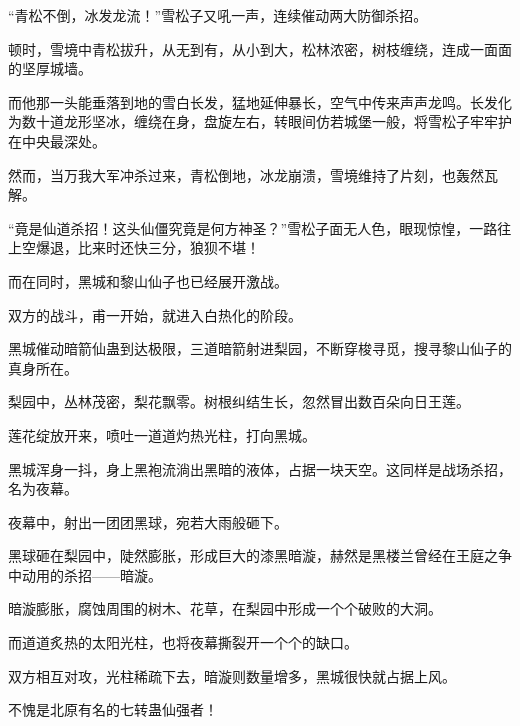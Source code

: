 \begin{this_body}
“青松不倒，冰发龙流！”雪松子又吼一声，连续催动两大防御杀招。

顿时，雪境中青松拔升，从无到有，从小到大，松林浓密，树枝缠绕，连成一面面的坚厚城墙。

而他那一头能垂落到地的雪白长发，猛地延伸暴长，空气中传来声声龙鸣。长发化为数十道龙形坚冰，缠绕在身，盘旋左右，转眼间仿若城堡一般，将雪松子牢牢护在中央最深处。

然而，当万我大军冲杀过来，青松倒地，冰龙崩溃，雪境维持了片刻，也轰然瓦解。

“竟是仙道杀招！这头仙僵究竟是何方神圣？”雪松子面无人色，眼现惊惶，一路往上空爆退，比来时还快三分，狼狈不堪！

而在同时，黑城和黎山仙子也已经展开激战。

双方的战斗，甫一开始，就进入白热化的阶段。

黑城催动暗箭仙蛊到达极限，三道暗箭射进梨园，不断穿梭寻觅，搜寻黎山仙子的真身所在。

梨园中，丛林茂密，梨花飘零。树根纠结生长，忽然冒出数百朵向日王莲。

莲花绽放开来，喷吐一道道灼热光柱，打向黑城。

黑城浑身一抖，身上黑袍流淌出黑暗的液体，占据一块天空。这同样是战场杀招，名为夜幕。

夜幕中，射出一团团黑球，宛若大雨般砸下。

黑球砸在梨园中，陡然膨胀，形成巨大的漆黑暗漩，赫然是黑楼兰曾经在王庭之争中动用的杀招——暗漩。

暗漩膨胀，腐蚀周围的树木、花草，在梨园中形成一个个破败的大洞。

而道道炙热的太阳光柱，也将夜幕撕裂开一个个的缺口。

双方相互对攻，光柱稀疏下去，暗漩则数量增多，黑城很快就占据上风。

不愧是北原有名的七转蛊仙强者！

\end{this_body}

